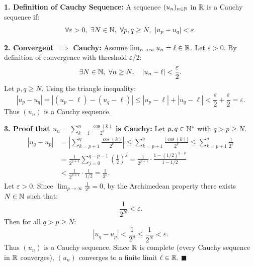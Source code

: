 \begin{tabletworkspace}[5.5cm]
\end{tabletworkspace}

\begin{solution}
\textbf{1. Definition of Cauchy Sequence:}
A sequence $(u_n)_{n \in \mathbb{N}}$ in $\mathbb{R}$ is a Cauchy sequence if:
\[
\forall \varepsilon > 0,\ \exists N \in \N,\ \forall p, q \ge N,\ |u_p - u_q| < \varepsilon.
\]

\textbf{2. Convergent $\implies$ Cauchy:}
Assume $\lim_{n \to \infty} u_n = \ell \in \mathbb{R}$.
Let $\varepsilon > 0$. By definition of convergence with threshold $\varepsilon/2$:
\[
\exists N \in \mathbb{N},\ \forall n \ge N, \quad |u_n - \ell| < \frac{\varepsilon}{2}.
\]
Let $p, q \ge N$. Using the triangle inequality:
\[
|u_p - u_q| = |(u_p - \ell) - (u_q - \ell)| \le |u_p - \ell| + |u_q - \ell| < \frac{\varepsilon}{2} + \frac{\varepsilon}{2} = \varepsilon.
\]
Thus $(u_n)$ is a Cauchy sequence.

\textbf{3. Proof that $u_n = \sum_{k=1}^n \frac{\cos(k)}{2^k}$ is Cauchy:}
Let $p, q \in \mathbb{N}^*$ with $q > p \ge N$.
\begin{align*}
|u_q - u_p| &= \left| \sum_{k=p+1}^q \frac{\cos(k)}{2^k} \right| \le \sum_{k=p+1}^q \frac{|\cos(k)|}{2^k} \le \sum_{k=p+1}^q \frac{1}{2^k} \\
&= \frac{1}{2^{p+1}} \sum_{j=0}^{q-p-1} \left(\frac{1}{2}\right)^j = \frac{1}{2^{p+1}} \cdot \frac{1 - (1/2)^{q-p}}{1 - 1/2} \\
&< \frac{1}{2^{p+1}} \cdot \frac{1}{1/2} = \frac{1}{2^p}.
\end{align*}
Let $\varepsilon > 0$. Since $\lim_{p \to \infty} \frac{1}{2^p} = 0$, by the Archimedean property there exists $N \in \mathbb{N}$ such that:
\[
\frac{1}{2^N} < \varepsilon.
\]
Then for all $q > p \ge N$:
\[
|u_q - u_p| < \frac{1}{2^p} \le \frac{1}{2^N} < \varepsilon.
\]
Thus $(u_n)$ is a Cauchy sequence.
Since $\mathbb{R}$ is complete (every Cauchy sequence in $\mathbb{R}$ converges), $(u_n)$ converges to a finite limit $\ell \in \mathbb{R}$. \hfill $\blacksquare$
\end{solution}

